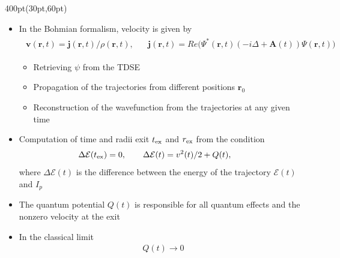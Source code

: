 \begin{frame}
\begin{textblock*}{400pt}(30pt,60pt)
\footnotesize
\begin{itemize}
\item In the Bohmian formalism, velocity is given by
\begin{align}
\begin{split}
 \boldsymbol{v}(\boldsymbol{r},t) 
   = \boldsymbol{j}(\boldsymbol{r},t) /  \rho(\boldsymbol{r},t), 
\hspace{20pt} 
\boldsymbol{j}(\boldsymbol{r},t) = Re\Bigg(\Psi^*(\boldsymbol{r},t)
\left( -i\Delta + \boldsymbol{A}(t)  \right) \Psi(\boldsymbol{r},t)\Bigg)
\nonumber
\end{split}
\end{align}
\begin{itemize}
\footnotesize
\item[$\bullet$] Retrieving $\psi$ from the TDSE
\item[$\bullet$] Propagation of the trajectories from different positions 
$\boldsymbol{r}_0$
\item[$\bullet$] Reconstruction of the wavefunction from the trajectories
at any given time
\end{itemize}
\item Computation of time and radii exit $t_{\rm ex}$ and $r_{\rm ex}$
from the condition
\begin{align}
\Delta \mathcal{E}(t_{\rm ex}) = 0, \hspace{20pt}
\Delta \mathcal{E}(t) = v^2(t)/2  + Q(t), \hspace{20pt} \nonumber
\end{align}
where  $\Delta \mathcal{E}(t)$ is the difference between the energy of 
the trajectory $\mathcal{E}(t)$ and $I_p$
\item The quantum potential $Q(t)$ is responsible for all quantum effects and the nonzero velocity at the exit 
\vspace{10pt}
\item In the classical limit 
\begin{align}
Q(t) \longrightarrow 0 \nonumber
\end{align}
\end{itemize}
\end{textblock*}




\end{frame}






